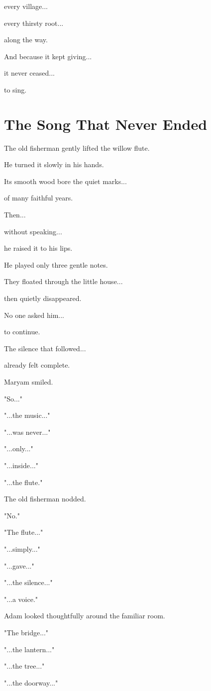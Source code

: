\documentclass[12pt,openany]{book}
\begin{document}
every village...

every thirsty root...

along the way.

And because it kept giving...

it never ceased...

to sing.
\section*{The Song That Never Ended}

The old fisherman gently lifted the willow flute.

He turned it slowly in his hands.

Its smooth wood bore the quiet marks...

of many faithful years.

Then...

without speaking...

he raised it to his lips.

He played only three gentle notes.

They floated through the little house...

then quietly disappeared.

No one asked him...

to continue.

The silence that followed...

already felt complete.

Maryam smiled.

"So..."

"...the music..."

"...was never..."

"...only..."

"...inside..."

"...the flute."

The old fisherman nodded.

"No."

"The flute..."

"...simply..."

"...gave..."

"...the silence..."

"...a voice."

Adam looked thoughtfully around the familiar room.

"The bridge..."

"...the lantern..."

"...the tree..."

"...the doorway..."
\end{document}
